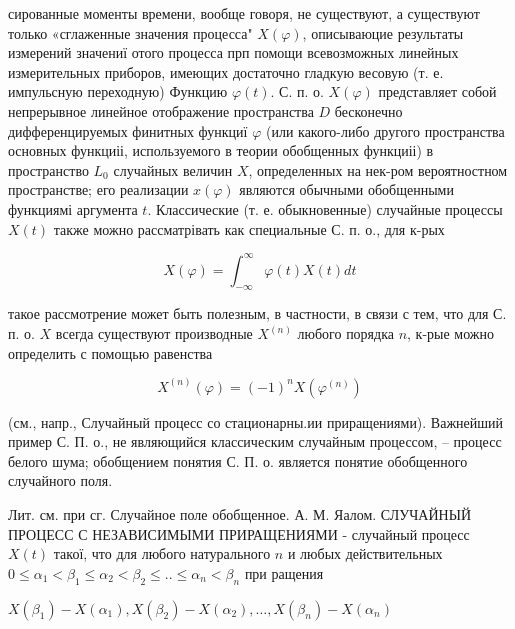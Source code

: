 \documentclass[10pt]{article}
\begin{document}
сированные моменты времени, вообще говоря, не существуют, а существуют только «сглаженные значения процесса" $X(\varphi)$, описываюцие результаты измерений значениї отого процесса прп помощи всевозможных линейных измерительных приборов, имеющих достаточно гладкую весовую (т. е. импульсную переходную) Функцию $\varphi(t)$. С. п. о. $X(\varphi)$ представляет собой непрерывное линейное отображение пространства $D$ бесконечно дифференцируемых финитных функциї $\varphi$ (или какого-либо другого пространства основных функциіі, используемого в теории обобщенных функциіі) в пространство $L_{0}$ случайных величин $X$, определенных на нек-ром вероятностном пространстве; его реализации $x(\varphi)$ являются обычными обобщенными функциямі аргумента $t$. Классические (т. е. обыкновенные) случайные процессы $X(t)$ также можно рассматрівать как специальные С. п. о., для к-рых



\[

X(\varphi)=\int_{-\infty}^{\infty} \varphi(t) X(t) d t

\]



такое рассмотрение может быть полезным, в частности, в связи с тем, что для С. п. о. $X$ всегда существуют производные $X^{(n)}$ любого порядка $n$, к-рые можно определить с помощью равенства



\[

X^{(n)}(\varphi)=(-1)^{n} X\left(\varphi^{(n)}\right)

\]



(см., напр., Случайный процесс со стационарны.ии приращениями). Важнейший пример С. П. о., не являющийся классическим случайным процессом, -- процесс белого шума; обобщением понятия С. П. о. является понятие обобщенного случайного поля.



Лит. см. при сг. Случайное поле обобщенное. А. М. Яалом. СЛУЧАЙНЫЙ ПРОЦЕСС С НЕЗАВИСИМЫМИ ПРИРАЩЕНИЯМИ - случайный процесс $X(t)$ такої, что для любого натурального $n$ и любых действительных $0 \leqslant \alpha_{1}<\beta_{1} \leqslant \alpha_{2}<\beta_{2} \leqslant . . \leqslant \alpha_{n}<\beta_{n}$ при ращения



$X\left(\beta_{1}\right)-X\left(\alpha_{1}\right), X\left(\beta_{2}\right)-X\left(\alpha_{2}\right), \ldots, X\left(\beta_{n}\right)-X\left(\alpha_{n}\right)$
\end{document}
